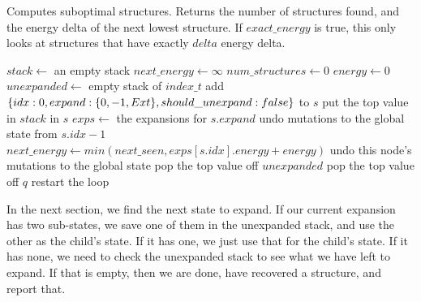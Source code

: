 \documentclass{cshonours}
\DeclarePairedDelimiter{\br}{\{}{\}}
\begin{document}
\begin{algorithm}[H]
\caption{Computes suboptimal structures. Returns the number of structures found, and the energy delta of the next lowest structure. If $exact\_energy$ is true, this only looks at structures that have exactly $delta$ energy delta.}
\label{alg:suboptimal_dfs}
\begin{algorithmic}[1]
\State $stack \gets $ an empty stack
\State $next\_energy \gets \infty$ 
\State $num\_structures \gets 0$ 
\State $energy \gets 0$ 
\State $unexpanded \gets$ empty stack of $index\_t$
\State add $\br{idx: 0, expand: \br{0, -1, Ext}, should\_unexpand: false}$ to $s$
\State put the top value in $stack$ in $s$ 
\State $exps \gets $ the expansions for $s.expand$ 
\State undo mutations to the global state from $s.idx - 1$ \label{line:undo1}
\EndIf
{}
\State $next\_energy \gets min(next\_seen, exps[s.idx].energy + energy)$
\EndIf
{} \label{line:sparsity}
\State undo this node's mutations to the global state  \label{line:undo2}
\State pop the top value off $unexpanded$
\EndIf
\State pop the top value off $q$
\State restart the loop
\EndIf {}
\end{algorithmic}
\end{algorithm}

In the next section, we find the next state to expand. If our current expansion has two sub-states, we save one of them in the unexpanded stack, and use the other as the child's state. If it has one, we just use that for the child's state. If it has none, we need to check the unexpanded stack to see what we have left to expand. If that is empty, then we are done, have recovered a structure, and report that.
\end{document}
